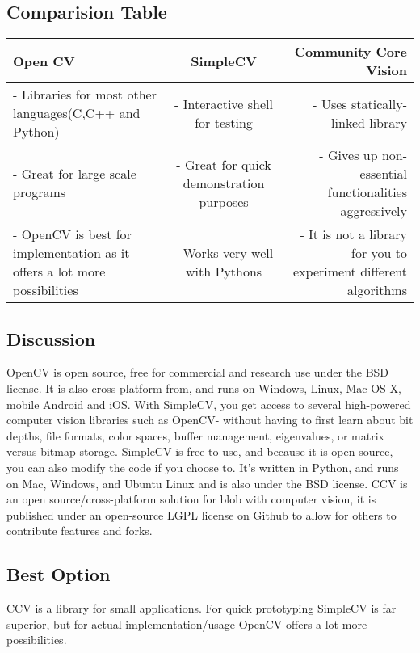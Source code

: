\documentclass{scrreprt}
\begin{document}
\subsection{Comparision Table}
\begin{center}
  \begin{tabular}{| l | c | r |}
    \hline
    Open CV & SimpleCV & Community Core Vision \\ \hline
    \parbox{5cm}{- Libraries for most other languages(C,C++ and Python)} & \parbox{5cm}{- Interactive shell for testing} & \parbox{5cm}{- Uses statically-linked library} \\
    \parbox{5cm}{- Great for large scale programs} & \parbox{5cm}{- Great for quick demonstration purposes} & \parbox{5cm}{- Gives up non-essential functionalities aggressively} \\
    \parbox{5cm}{- OpenCV is best for implementation as it offers a lot more possibilities} & \parbox{5cm}{- Works very well with Pythons} & \parbox{5cm}{- It is not a library for you to experiment different algorithms} \\
    \hline
  \end{tabular}
\end{center}

\subsection{Discussion}
OpenCV is open source, free for commercial and research use under the BSD license.
It is also cross-platform from, and runs on Windows, Linux, Mac OS X, mobile Android and iOS. With SimpleCV, you get access to several high-powered computer vision libraries such as OpenCV- without having to first learn about bit depths, file formats, color spaces, buffer management, eigenvalues, or matrix versus bitmap storage.
SimpleCV is free to use, and because it is open source, you can also modify the code if you choose to.
It’s written in Python, and runs on Mac, Windows, and Ubuntu Linux and is also under the BSD license.
CCV is an open source/cross-platform solution for blob with computer vision,
it is published under an open-source LGPL license on Github to allow for others to contribute features and forks.


\subsection{Best Option}
CCV is a library for small applications.
For quick prototyping SimpleCV is far superior, but for actual implementation/usage OpenCV offers a lot more possibilities.
\end{document}
